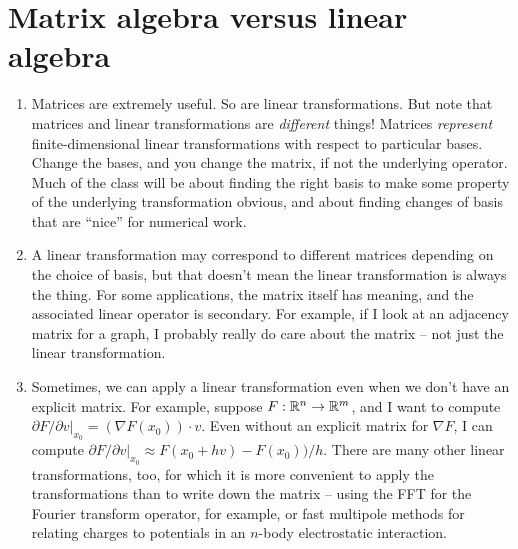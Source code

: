 \documentclass[12pt, leqno]{article}
\begin{document}



\section*{Matrix algebra versus linear algebra}

\begin{enumerate}
\item
  Matrices are extremely useful.  So are linear transformations.  But note
  that matrices and linear transformations are {\em different} things!
  Matrices {\em represent} finite-dimensional linear transformations with
  respect to particular bases.  Change the bases, and you change the
  matrix, if not the underlying operator.  Much of the class will be about
  finding the right basis to make some property of the underlying transformation
  obvious, and about finding changes of basis that are ``nice'' for
  numerical work.

\item
  A linear transformation may correspond to different matrices depending on the
  choice of basis, but that doesn't mean the linear transformation is always the
  thing.  For some applications, the matrix itself has meaning, and the
  associated linear operator is secondary.  For example, if I look at 
  an adjacency matrix for a graph, I probably really do care about the matrix --
  not just the linear transformation.

\item
  Sometimes, we can apply a linear transformation even when we don't have an
  explicit matrix.  For example, suppose $F : \mathbb{R}^n \rightarrow
  \mathbb{R}^m$, and I want to compute 
  $\partial F / \partial v|_{x_0} = (\nabla F(x_0)) \cdot v$.
  Even without an explicit matrix for $\nabla F$, I can compute
  $\partial F / \partial v|_{x_0} \approx F(x_0 + hv)-F(x_0))/h$.
  There are many other linear transformations, too, for which it is
  more convenient to apply the transformations than to write down the
  matrix -- using the FFT for the Fourier transform operator, for
  example, or fast multipole methods for relating charges to potentials
  in an $n$-body electrostatic interaction.

\end{enumerate}
\end{document}
